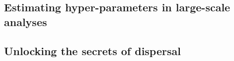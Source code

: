 \documentclass[
]{book}
\begin{document}
\hypertarget{estimating-hyper-parameters-in-large-scale-analyses}{%
\subsection{Estimating hyper-parameters in large-scale analyses}\label{estimating-hyper-parameters-in-large-scale-analyses}}

\hypertarget{unlocking-the-secrets-of-dispersal}{%
\subsection{Unlocking the secrets of dispersal}\label{unlocking-the-secrets-of-dispersal}}

  
\end{document}
